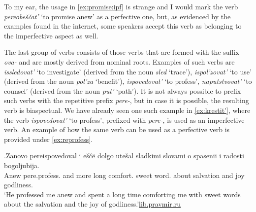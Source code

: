 To my ear, the usage in \ref{ex:promise:ipf} is strange and I would mark the verb \textit{pereobe\v{s}\v{c}at'} `to promise anew' as a perfective one, but, as evidenced by the examples found in the internet, some speakers accept this verb as belonging to the imperfective aspect as well.

The last group of verbs consists of those verbs that are formed with the suffix \textit{-ova-} and are mostly derived from nominal roots. Examples of such verbs are \textit{issledovat'} `to investigate' (derived from the noun \textit{sled} `trace'), \textit{ispol'zovat'} `to use' (derived from the noun \textit{pol'za} `benefit'), \textit{ispovedovat'} `to profess', \textit{naputstvovat'} `to counsel' (derived from the noun \textit{put'} `path'). It is not always possible to prefix such verbs with the repetitive prefix \textit{pere-}, but in case it is possible, the resulting verb is biaspectual. We have already seen one such example in \ref{ex:krestit'}, where the verb \textit{ispovedovat'} `to profess', prefixed with \textit{pere-}, is used as an imperfective verb. An example of how the same verb can be used as a perfective verb is provided under \ref{ex:reprofess}.

\exg.\label{ex:reprofess}Zanovo pereispovedoval i e\v{s}\v{c}\"{e} dolgo ute\v{s}al sladkimi slovami o spasenii i radosti bogoljubija.\\
Anew pere.profess. and more long comfort. sweet word. about salvation and joy godliness.\\
\trans `He professed me anew and spent a long time comforting me with sweet words about the salvation and the joy of godliness.'\hbox{}\hfill\hbox{\url{lib.pravmir.ru}}


